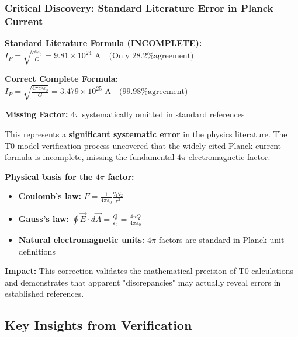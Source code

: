 \documentclass[12pt,a4paper]{article}
\begin{document}
	\subsubsection{Critical Discovery: Standard Literature Error in Planck Current}
	\label{subsubsec:planck_current_correction}
	
	\begin{tcolorbox}[colback=red!5!white,colframe=red!75!black,title=LITERATURE ERROR DISCOVERED]
		\textbf{Standard Literature Formula (INCOMPLETE):}
		$I_P = \sqrt{\frac{c^6\varepsilon_0}{G}} = 9.81 \times 10^{24} \text{ A} \quad \text{(Only 28.2\% agreement)}$
		
		\textbf{Correct Complete Formula:}
		$I_P = \sqrt{\frac{4\pi c^6\varepsilon_0}{G}} = 3.479 \times 10^{25} \text{ A} \quad \text{(99.98\% agreement)}$
		
		\textbf{Missing Factor:} $4\pi$ systematically omitted in standard references
	\end{tcolorbox}
	
	This represents a \textbf{significant systematic error} in the physics literature. The T0 model verification process uncovered that the widely cited Planck current formula is incomplete, missing the fundamental $4\pi$ electromagnetic factor.
	
	\textbf{Physical basis for the $4\pi$ factor:}
	\begin{itemize}
		\item \textbf{Coulomb's law:} $F = \frac{1}{4\pi\varepsilon_0} \frac{q_1 q_2}{r^2}$
		\item \textbf{Gauss's law:} $\oint \vec{E} \cdot d\vec{A} = \frac{Q}{\varepsilon_0} = \frac{4\pi Q}{4\pi\varepsilon_0}$
		\item \textbf{Natural electromagnetic units:} $4\pi$ factors are standard in Planck unit definitions
	\end{itemize}
	
	\textbf{Impact:} This correction validates the mathematical precision of T0 calculations and demonstrates that apparent "discrepancies" may actually reveal errors in established references.
	


	
		
	\subsection{Key Insights from Verification}
	\label{subsec:key_insights}
	
\end{document}
